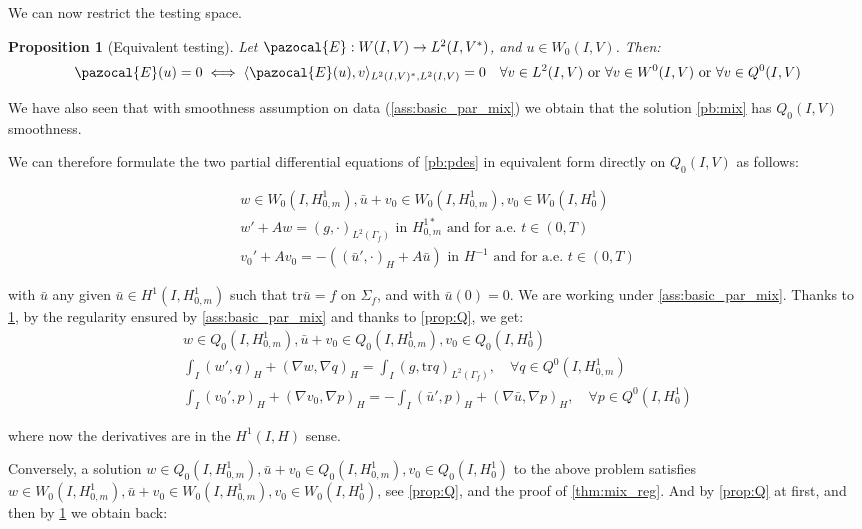 \documentclass[english,a4paper,9pt,oneside]{scrbook}	%
\theoremstyle{break}
\newtheorem{prop}[equation]{Proposition}
\theoremstyle{remark}
\newcommand{\tr}{\text{tr}}
\begin{document}
\begin{appendices}
We can now restrict the testing space.

\begin{prop}[Equivalent testing]
\label{prop:eq_test}
Let $\pazocal{E}: W(I,V)\rightarrow L^2(I,V^*)$, and $u\in W_0(I,V)$. Then:
\begin{align*}
\pazocal{E}(u)=0 
\iff 
\langle \pazocal{E}(u), v\rangle_{L^2(I,V)^*, L^2(I,V)}=0 \quad \forall v \in L^2(I,V) \text{ or }\forall v \in W^0(I,V) \text{ or } \forall v \in Q^0(I,V) 
\end{align*}

\end{prop}

We have also seen that with smoothness assumption on data (\cref{ass:basic_par_mix}) we obtain that the solution \cref{pb:mix} has $Q_0(I,V)$ smoothness. 

We can therefore formulate the two partial differential equations of \cref{pb:pdes} in equivalent form directly on $Q_0(I,V)$ as follows:

\begin{align*}
w \in W_0(I, H^1_{0,m}),\bar{u}+v_0 \in W_0(I,H^1_{0,m}), v_0 \in W_0(I,H^1_0)\\
w' + A w = (g,\cdot)_{L^2(\Gamma_f)} \text{ in }H^{1*}_{0,m} \text{ and for a.e. } t \in (0,T) \\
v_0' + A v_0 = -((\bar{u}',\cdot)_H+A \bar{u}) \text{ in }H^{-1} \text{ and for a.e. } t \in (0,T) 
\end{align*}

with $\bar{u}$ any given $\bar{u}\in H^1(I,H^1_{0,m})$ such that $\tr \bar{u} =f$ on $\Sigma_f$, and with $\bar{u}(0)=0$.
We are working under \cref{ass:basic_par_mix}.
Thanks to \cref{prop:eq_test}, by the regularity ensured by \cref{ass:basic_par_mix} and thanks to \cref{prop:Q}, we get:
\begin{align*}
w \in Q_0(I, H^1_{0,m}), \bar{u}+v_0 \in Q_0(I,H^1_{0,m}), v_0 \in Q_0(I,H^1_0) \\
\int_I ( w' , q)_H+ (\nabla w, \nabla q)_H = \int_I(g,\tr q)_{L^2(\Gamma_f)}, \quad \forall q \in Q^0(I, H^1_{0,m}) \\
\int_I (v_0',p)_H + (\nabla v_0, \nabla p)_H= -\int_I(\bar{u}',p)_H+(\nabla \bar{u}, \nabla p)_H, \quad \forall p \in Q^0(I, H^1_0) 
\end{align*}

where now the derivatives are in the $H^1(I,H)$ sense.

Conversely, a solution $w \in Q_0(I, H^1_{0,m}), \bar{u}+v_0 \in Q_0(I,H^1_{0,m}), v_0 \in Q_0(I,H^1_0) $ to the above problem satisfies $w \in W_0(I, H^1_{0,m}), \bar{u}+v_0 \in W_0(I,H^1_{0,m}), v_0 \in W_0(I,H^1_0)$, see \cref{prop:Q}, and the proof of \cref{thm:mix_reg}. And by \cref{prop:Q} at first, and then by \cref{prop:eq_test} we obtain back:


\end{appendices}
\end{document}
